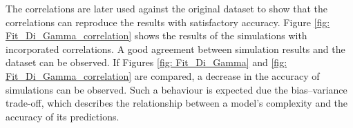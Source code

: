 \documentclass[../Supercritical_fluid_extraction_of_essential_oil_from_chamomile.tex]{subfiles}
\begin{document}
	The correlations are later used against the original dataset to show that the correlations can reproduce the results with satisfactory accuracy. Figure \ref{fig: Fit_Di_Gamma_correlation} shows the results of the simulations with incorporated correlations. A good agreement between simulation results and the dataset can be observed. If Figures \ref{fig: Fit_Di_Gamma} and \ref{fig: Fit_Di_Gamma_correlation} are compared, a decrease in the accuracy of simulations can be observed. Such a behaviour is expected due the bias–variance trade-off, which describes the relationship between a model's complexity and the accuracy of its predictions.
	
\end{document}
